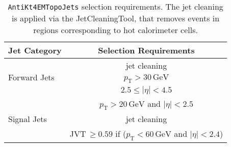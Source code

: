 \begin{table}[h]
  \centering
  \begin{tabular}{l c  c  c}
    \hline
    \hline
    \multicolumn{1}{c}{Jet Category} &
    \multicolumn{3}{c}{Selection Requirements} \\
    \hline
    \multirow{3}{*}{Forward Jets} & \multicolumn{3}{c}{jet cleaning} \\
    & \multicolumn{3}{c}{$p_{\mathrm{T}} > 30\,\mathrm{GeV}$} \\
    & \multicolumn{3}{c}{$2.5 \leq \left|\eta\right| < 4.5$} \\ [2ex]
    \hline
    \multirow{3}{*}{Signal Jets} & \multicolumn{3}{c}{$p_{\mathrm{T}} > 20\,\mathrm{GeV}$ and $\left|\eta\right| < 2.5$}\\
    & \multicolumn{3}{c}{jet cleaning} \\
    & \multicolumn{3}{c}{JVT$\,\geq 0.59$ if ($p_{\mathrm{T}} < 60\,\mathrm{GeV}$ and $\left|\eta\right| < 2.4$)}\\
    \hline
    \hline
  \end{tabular}
  \caption[Table caption text]{\texttt{AntiKt4EMTopoJets} selection requirements. The jet 
cleaning is applied via the JetCleaningTool, that removes events in regions corresponding to hot calorimeter cells. }
  \label{JetReqs}
\end{table}
